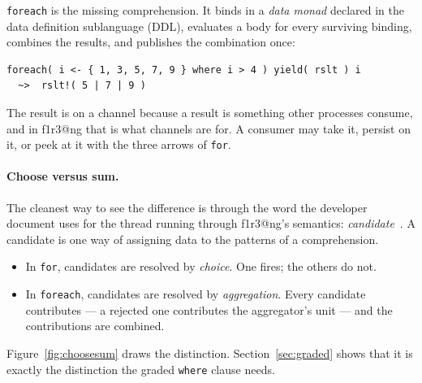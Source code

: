 \documentclass[11pt]{article}
\makeatletter
\theoremstyle{definition}
\theoremstyle{plain}
\theoremstyle{remark}
\newcommand{\fe}{\texttt{foreach}}
\newcommand{\flang}{\textsf{f1r3\textbar @ng}}
\makeatother
\begin{document}
\fe{} is the missing comprehension. It binds in a \emph{data monad} declared in
the data definition sublanguage (DDL), evaluates a body for every surviving
binding, combines the results, and publishes the combination once:
\begin{lstlisting}
foreach( i <- { 1, 3, 5, 7, 9 } where i > 4 ) yield( rslt ) i
  ~>  rslt!( 5 | 7 | 9 )
\end{lstlisting}
The result is on a channel because a result is something other processes
consume, and in \flang{} that is what channels are for. A consumer may take it,
persist on it, or peek at it with the three arrows of \texttt{for}.

\paragraph{Choose versus sum.} The cleanest way to see the difference is through
the word the developer document uses for the thread running through
\flang{}'s semantics: \emph{candidate}~\cite{F1R3Dev}. A candidate is one way
of assigning data to the patterns of a comprehension.
\begin{itemize}[nosep]
\item In \texttt{for}, candidates are resolved by \emph{choice}. One fires; the
others do not.
\item In \fe{}, candidates are resolved by \emph{aggregation}. Every candidate
contributes --- a rejected one contributes the aggregator's unit --- and the
contributions are combined.
\end{itemize}
Figure~\ref{fig:choosesum} draws the distinction. Section~\ref{sec:graded}
shows that it is exactly the distinction the graded \texttt{where} clause needs.
\end{document}
